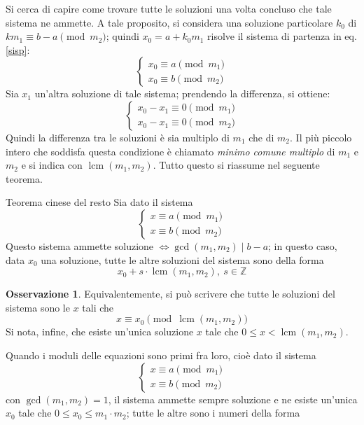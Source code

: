 \documentclass[11pt, a4paper]{scrartcl}
\theoremstyle{definition}
\numberwithin{esempio}{section}
\theoremstyle{definition}
\newtheorem{obs}{Osservazione}
\numberwithin{obs}{section}
\numberwithin{nota}{section}
\numberwithin{equation}{subsection}
\begin{document}
Si cerca di capire come trovare tutte le soluzioni una volta concluso che tale sistema ne ammette.
A tale proposito, si considera una soluzione particolare $k_0$ di $km_1 \equiv b-a \pmod{m_2} $; quindi $x_0 = a + k_0 m_1$ risolve il sistema di partenza in eq. \ref{sisp}:
\[
\begin{cases}
	x_0 \equiv a \pmod{m_1} \\
	x_0 \equiv b \pmod{m_2} 
\end{cases}
\] 
Sia $x_1$ un'altra soluzione di tale sistema; prendendo la differenza, si ottiene:
\[
	\begin{cases}
x_0-x_1 \equiv 0 \pmod{m_1} \\
x_0-x_1\equiv 0 \pmod{m_2} 
	\end{cases}
\] 
Quindi la differenza tra le soluzioni \`e sia multiplo di $m_1$ che di $m_2$.
Il pi\`u piccolo intero che soddisfa questa condizione \`e chiamato \textit{minimo comune multiplo} di $m_1$ e $m_2$ e si indica con $\operatorname{lcm} (m_1,m_2)$.
Tutto questo si riassume nel seguente teorema.
\begin{teorema}
	{Teorema cinese del resto}{}
	Sia dato il sistema 
	\[
	\begin{cases}
		x\equiv a \pmod{m_1} \\
		x \equiv b \pmod{m_2} 
	\end{cases}
	\] 
Questo sistema ammette soluzione $\iff \operatorname{gcd}(m_1,m_2)  \mid b-a$; in questo caso, data $x_0$ una soluzione, tutte le altre soluzioni del sistema sono della forma
\[
x_0 + s \cdot \operatorname{lcm} (m_1,m_2) ,\ s \in \mathbb{Z}
\] 
\end{teorema}
\begin{obs}
	Equivalentemente, si pu\`o scrivere che tutte le soluzioni del sistema sono le $x$ tali che
	\begin{equation}
		x\equiv x_0 \pmod{\operatorname{lcm} (m_1,m_2)} 
	\end{equation}
	Si nota, infine, che esiste un'unica soluzione $x $ tale che $0\le  x < \operatorname{lcm} (m_1,m_2)$.
\end{obs}
Quando i moduli delle equazioni sono primi fra loro, cio\`e dato il sistema 
\[
\begin{cases}
	x \equiv a \pmod{m_1} \\
	x \equiv b \pmod{m_2} 
\end{cases}
\] 
con $\operatorname{gcd}(m_1,m_2) =1$, il sistema ammette sempre soluzione e ne esiste un'unica $x_0$ tale che $0\le x_0\le m_1\cdot m_2$; tutte le altre sono i numeri della forma
\end{document}

